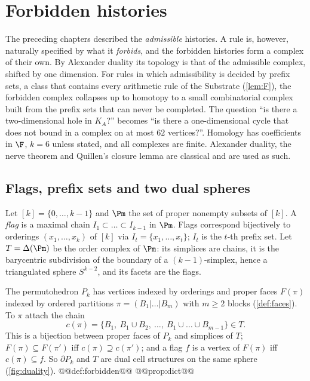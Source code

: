 \chapter{Forbidden histories}\label{ch:duality}

The preceding chapters described the \emph{admissible} histories. A rule is, however, naturally specified by what it \emph{forbids}, and the forbidden histories form a complex of their own. By Alexander duality its topology is that of the admissible complex, shifted by one dimension. For rules in which admissibility is decided by prefix sets, a class that contains every arithmetic rule of the Substrate (\cref{lem:F}), the forbidden complex collapses up to homotopy to a small combinatorial complex built from the prefix sets that can never be completed. The question ``is there a two-dimensional hole in $K_A$?'' becomes ``is there a one-dimensional cycle that does not bound in a complex on at most $62$ vertices?''. Homology has coefficients in $\F$, $k=6$ unless stated, and all complexes are finite. Alexander duality, the nerve theorem and Quillen's closure lemma are classical and are used as such.

\section{Flags, prefix sets and two dual spheres}\label{sec:flags}
Let $[k]=\{0,\dots,k-1\}$ and $\Pm$ the set of proper nonempty subsets of $[k]$. A \emph{flag} is a maximal chain $I_1\subset\dots\subset I_{k-1}$ in $\Pm$. Flags correspond bijectively to orderings $(x_1,\dots,x_k)$ of $[k]$ via $I_t=\{x_1,\dots,x_t\}$; $I_t$ is the $t$-th prefix set. Let $T=\Delta(\Pm)$ be the order complex of $\Pm$: its simplices are chains, it is the barycentric subdivision of the boundary of a $(k{-}1)$-simplex, hence a triangulated sphere $S^{k-2}$, and its facets are the flags.

The permutohedron $P_k$ has vertices indexed by orderings and proper faces $F(\pi)$ indexed by ordered partitions $\pi=(B_1|\dots|B_m)$ with $m\ge2$ blocks (\cref{def:faces}). To $\pi$ attach the chain
\[
c(\pi)=\{B_1,\ B_1\cup B_2,\ \dots,\ B_1\cup\dots\cup B_{m-1}\}\in T .
\]
This is a bijection between proper faces of $P_k$ and simplices of $T$; $F(\pi)\subseteq F(\pi')$ iff $c(\pi)\supseteq c(\pi')$; and a flag $f$ is a vertex of $F(\pi)$ iff $c(\pi)\subseteq f$. So $\partial P_k$ and $T$ are dual cell structures on the same sphere (\cref{fig:duality}).
@@def:forbidden@@
@@prop:dict@@

